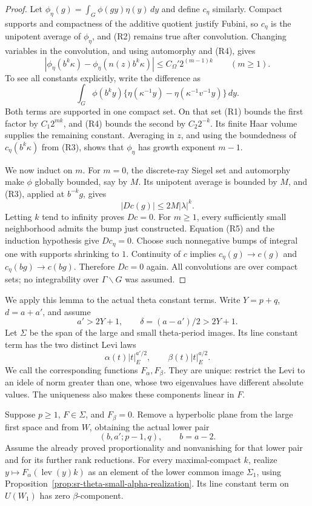 \begin{proof}
Let \(\phi_\eta(g)=\int_G\phi(gy)\eta(y)\,dy\) and define \(c_\eta\)
similarly. Compact supports and compactness of the additive
quotient justify Fubini, so \(c_\eta\) is the unipotent average
of \(\phi_\eta\), and (R2) remains true after convolution.
Changing variables in the convolution, and using automorphy
and (R4), gives
\[
 \left|\phi_\eta(b^k\kappa)
          -\phi_\eta(n(z)b^k\kappa)\right|
       \le C_\Omega' 2^{(m-1)k}\qquad(m\ge1).
 \tag{R5}\label{eq:sr-contraction-growth-drop}
\]
To see all constants explicitly, write the difference as
\[
 \int_G \phi(b^ky)
       \{\eta(\kappa^{-1}y)
                 -\eta(\kappa^{-1}v^{-1}y)\}\,dy .
\]
Both terms are supported in one compact set. On that set (R1)
bounds the first factor by \(C_1 2^{mk}\), and (R4) bounds
the second by \(C_2 2^{-k}\). Its finite Haar volume supplies
the remaining constant. Averaging in \(z\), and using the
boundedness of \(c_\eta(b^k\kappa)\) from (R3), shows that
\(\phi_\eta\) has growth exponent \(m-1\).

We now induct on \(m\). For \(m=0\), the discrete-ray Siegel set
and automorphy make \(\phi\) globally bounded, say by \(M\).
Its unipotent average is bounded by \(M\), and (R3), applied
at \(b^{-k}g\), gives
\[
 |Dc(g)|\le 2M|\lambda|^k.
\]
Letting \(k\) tend to infinity proves \(Dc=0\).
For \(m\ge1\), every sufficiently small neighborhood admits
the bump just constructed. Equation (R5) and the induction
hypothesis give \(Dc_\eta=0\).
Choose such nonnegative bumps of integral one with supports
shrinking to \(1\). Continuity of \(c\) implies
\(c_\eta(g)\to c(g)\) and \(c_\eta(bg)\to c(bg)\).
Therefore \(Dc=0\) again. All convolutions are over compact sets;
no integrability over \(\Gamma\backslash G\) was assumed.
\end{proof}

We apply this lemma to the actual theta constant terms.
Write \(Y=p+q\), \(d=a+a'\), and assume
\[
 a'>2Y+1,\qquad \delta=(a-a')/2>2Y+1.
 \tag{R6}\label{eq:sr-two-step-range}
\]
Let \(\Sigma\) be the span of the large and small theta-period
images. Its line constant term has the two distinct Levi laws
\[
        \alpha(t)|t|_E^{a'/2},
        \qquad \beta(t)|t|_E^{a/2}.                \tag{R7}
 \label{eq:sr-two-step-upper-laws}
\]
We call the corresponding functions \(F_\alpha,F_\beta\).
They are unique: restrict the Levi to an idele of norm greater
than one, whose two eigenvalues have different absolute values.
The uniqueness also makes these components linear in \(F\).

\begin{srlemma}
\label{lem:sr-theta-two-step-kill}
Suppose \(p\ge1\), \(F\in\Sigma\), and \(F_\beta=0\).
Remove a hyperbolic plane from the large first space and from
\(W\), obtaining the actual lower pair
\[
     (b,a';p-1,q),\qquad b=a-2.
\]
Assume the already proved proportionality and nonvanishing for
that lower pair and for its further rank reductions.
For every maximal-compact \(k\), realize
\(y\mapsto F_\alpha(\operatorname{lev}(y)k)\) as an element of
the lower common image \(\Sigma_1\), using
Proposition~\ref{prop:sr-theta-small-alpha-realization}.
Its line constant term on \(U(W_1)\) has zero \(\beta\)-component.
\end{srlemma}

